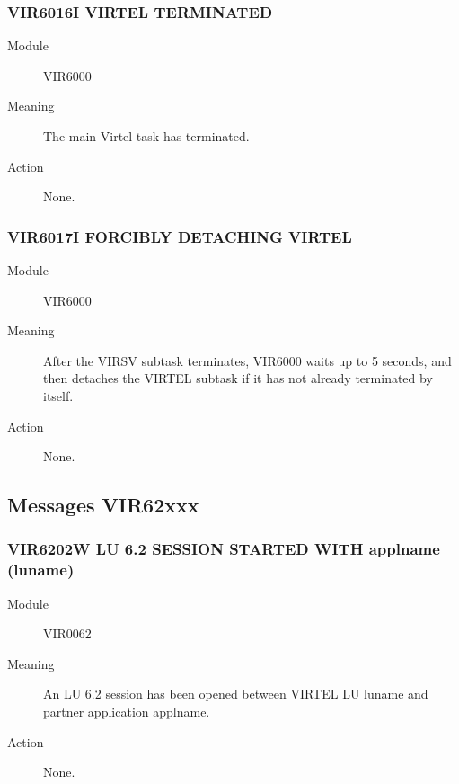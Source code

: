 \documentclass[letterpaper,10pt,english]{sphinxmanual}
\begin{document}
\subsubsection{VIR6016I VIRTEL TERMINATED}
\label{\detokenize{messages:vir6016i-virtel-terminated}}\begin{description}
\item[{Module}] \leavevmode
VIR6000

\item[{Meaning}] \leavevmode
The main Virtel task has terminated.

\item[{Action}] \leavevmode
None.

\end{description}


\subsubsection{VIR6017I FORCIBLY DETACHING VIRTEL}
\label{\detokenize{messages:vir6017i-forcibly-detaching-virtel}}\begin{description}
\item[{Module}] \leavevmode
VIR6000

\item[{Meaning}] \leavevmode
After the VIRSV subtask terminates, VIR6000 waits up to 5 seconds, and then detaches the VIRTEL subtask if it has not already terminated by itself.

\item[{Action}] \leavevmode
None.

\end{description}


\subsection{Messages VIR62xxx}
\label{\detokenize{messages:messages-vir62xxx}}

\subsubsection{VIR6202W LU 6.2 SESSION STARTED WITH applname (luname)}
\label{\detokenize{messages:vir6202w-lu-6-2-session-started-with-applname-luname}}\begin{description}
\item[{Module}] \leavevmode
VIR0062

\item[{Meaning}] \leavevmode
An LU 6.2 session has been opened between VIRTEL LU luname and partner application applname.

\item[{Action}] \leavevmode
None.

\end{description}
\end{document}
